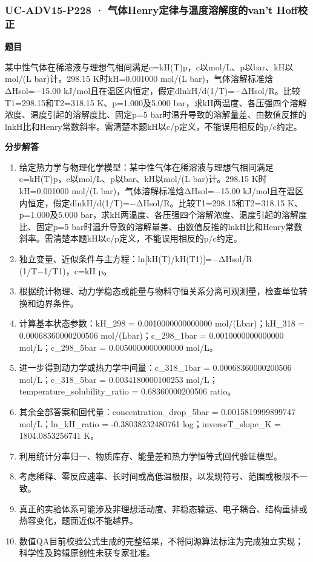\documentclass[UTF8,11pt,a4paper]{ctexart}
\begin{document}
\subsubsection*{UC-ADV15-P228 · 气体Henry定律与温度溶解度的van’t Hoff校正}
\noindent\textbf{题目}\par
某中性气体在稀溶液与理想气相间满足c=kH(T)p，c以mol/L、p以bar、kH以mol/(L bar)计。298.15 K时kH=0.001000 mol/(L bar)，气体溶解标准焓ΔHsol=−15.00 kJ/mol且在温区内恒定，假定dlnkH/d(1/T)=−ΔHsol/R。比较T1=298.15和T2=318.15 K、p=1.000及5.000 bar，求kH两温度、各压强四个溶解浓度、温度引起的溶解度比、固定p=5 bar时温升导致的溶解量差、由数值反推的lnkH比和Henry常数斜率。需清楚本题kH以c/p定义，不能误用相反的p/c约定。\par
\medskip\noindent\textbf{分步解答}
\begin{enumerate}
\item 给定热力学与物理化学模型：某中性气体在稀溶液与理想气相间满足c=kH(T)p，c以mol/L、p以bar、kH以mol/(L bar)计。298.15 K时kH=0.001000 mol/(L bar)，气体溶解标准焓ΔHsol=−15.00 kJ/mol且在温区内恒定，假定dlnkH/d(1/T)=−ΔHsol/R。比较T1=298.15和T2=318.15 K、p=1.000及5.000 bar，求kH两温度、各压强四个溶解浓度、温度引起的溶解度比、固定p=5 bar时温升导致的溶解量差、由数值反推的lnkH比和Henry常数斜率。需清楚本题kH以c/p定义，不能误用相反的p/c约定。
\item 独立变量、近似条件与主方程：ln[kH(T)/kH(T1)]=−ΔHsol/R (1/T−1/T1)，c=kH p。
\item 根据统计物理、动力学稳态或能量与物料守恒关系分离可观测量，检查单位转换和边界条件。
\item 计算基本状态参数：kH\_298 = 0.0010000000000000 mol/(Lbar)；kH\_318 = 0.00068360000200506 mol/(Lbar)；c\_298\_1bar = 0.0010000000000000 mol/L；c\_298\_5bar = 0.0050000000000000 mol/L。
\item 进一步得到动力学或热力学中间量：c\_318\_1bar = 0.00068360000200506 mol/L；c\_318\_5bar = 0.0034180000100253 mol/L；temperature\_solubility\_ratio = 0.68360000200506 ratio。
\item 其余全部答案和回代量：concentration\_drop\_5bar = 0.0015819999899747 mol/L；ln\_kH\_ratio = -0.38038232480761 log；inverseT\_slope\_K = 1804.0853256741 K。
\item 利用统计分率归一、物质库存、能量差和热力学恒等式回代验证模型。
\item 考虑稀释、零反应速率、长时间或高低温极限，以发现符号、范围或极限不一致。
\item 真正的实验体系可能涉及非理想活动度、非稳态输运、电子耦合、结构重排或热容变化，题面近似不能越界。
\item 数值QA目前校验公式生成的完整结果，不将同源算法标注为完成独立实现；科学性及跨辑原创性未获专家批准。
\end{enumerate}
\end{document}

